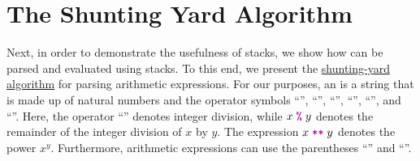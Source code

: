 \section{The Shunting Yard Algorithm}
Next, in order to demonstrate the usefulness of stacks, we show how  can be
parsed and evaluated using stacks.  To this end, we present the
\href{https://en.wikipedia.org/wiki/Shunting-yard_algorithm}{shunting-yard algorithm}
 for parsing arithmetic expressions.  
For our purposes, an  is a string that is made up of natural numbers and
the operator symbols ``\mytt{+}'', ``\mytt{-}'', ``\mytt{*}'', ``\mytt{/}'',
``'', and ``\mytt{**}''. Here, the operator ``\mytt{/}'' denotes integer division,
while $x \;\mytt{\symbol{37}}\; y$ denotes the remainder of the integer division of $x$ by $y$.  The expression $x\;\mytt{**}\;y$ denotes the power $x^y$.
Furthermore, arithmetic expressions can use the parentheses ``\mytt{(}'' and ``\mytt{)}''.

